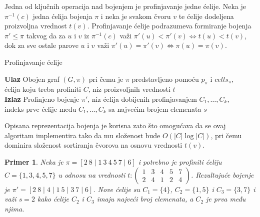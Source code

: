 \documentclass[12pt,oneside]{memoir}
\newtheorem{example}{Primer}
\theoremstyle{definition}
\begin{document}
   Jedna od ključnih operacija nad bojenjem je profinjavanje jedne ćelije. Neka
   je $\pi^{-1}(c)$ jedna ćelija bojenja $\pi$ i neka je svakom čvoru $v$ te
   ćelije dodeljena proizvoljna vrednost $t(v)$. Profinjavanje ćelije
   podrazumeva formiranje bojenja $\pi' \leq \pi$ takvog da za $u$ i $v$ iz
   $\pi^{-1}(c)$ važi $\pi'(u) < \pi'(v) \iff t(u) < t(v)$, dok za sve ostale
   parove $u$ i $v$ važi $\pi'(u) = \pi'(v) \iff \pi(u) = \pi(v)$.

  \begin{algorithm}[H]
	  \caption{Profinjavanje ćelije}
	  \textbf{Ulaz}
		  Obojen graf $(G, \pi)$ pri čemu je $\pi$ predstavljeno pomoću
		  $p_\pi$ i $cells_\pi$,\\ ćelija koju treba profiniti $C$,
		  niz proizvoljnih vrednosti $t$\\
	  \textbf{Izlaz}
	  	  Profinjeno bojenje $\pi'$,
		  niz ćelija dobijenih profinjavanjem $C_1, \dots, C_k$,\\
		  indeks prve ćelije među $C_1, \dots, C_k$ sa najvećim brojem elemenata $s$
	  \begin{algorithmic}[1]
			\EndFor
		  \EndFor
		  \State{}
		  \EndProcedure
	  \end{algorithmic}
  \end{algorithm}

  Opisana reprezentacija bojenja je korisna zato što omogućava da se ovaj
  algoritam implementira tako da mu složenost bude $O(|C| \log |C|)$, pri čemu
  dominira složenost sortiranja čvorova na osnovu vrednosti $t(v)$.

   \begin{example}
	   Neka je $\pi = [2\ 8 \mid 1\ 3\ 4\ 5\ 7 \mid 6]$ i potrebno je profiniti
	   ćeliju $C = \{1, 3, 4, 5, 7\}$ u odnosu na vrednosti $t :
	   \begin{pmatrix}1 & 3 & 4 & 5 & 7\\ 2 & 4 & 1 & 2 & 4\end{pmatrix}$.
	   Rezultujuće bojenje je $\pi' = [2\ 8 \mid 4 \mid 1\ 5 \mid 3\ 7 \mid
	   6]$.  Nove ćelije su $C_1 = \{4\}$, $C_2 = \{1, 5\}$ i $C_3 = \{3, 7\}$
	   i važi $s = 2$ kako ćelije $C_2$ i $C_3$ imaju najveći broj
	   elemenata, a $C_2$ je prva među njima.
   \end{example}
\end{document}
